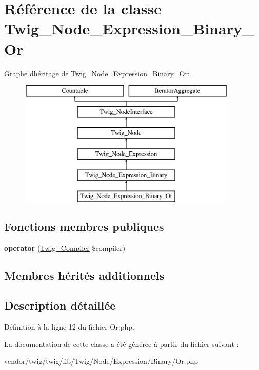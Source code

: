 \hypertarget{class_twig___node___expression___binary___or}{}\section{Référence de la classe Twig\+\_\+\+Node\+\_\+\+Expression\+\_\+\+Binary\+\_\+\+Or}
\label{class_twig___node___expression___binary___or}
Graphe d\textquotesingle{}héritage de Twig\+\_\+\+Node\+\_\+\+Expression\+\_\+\+Binary\+\_\+\+Or\+:\begin{figure}[H]
\begin{center}
\leavevmode
\includegraphics[height=6.000000cm]{class_twig___node___expression___binary___or}
\end{center}
\end{figure}
\subsection*{Fonctions membres publiques}
\begin{DoxyCompactItemize}
\item 
{\bfseries operator} (\hyperlink{class_twig___compiler}{Twig\+\_\+\+Compiler} \$compiler)\hypertarget{class_twig___node___expression___binary___or_af77318ec88d5f8a508684970a150b670}{}\label{class_twig___node___expression___binary___or_af77318ec88d5f8a508684970a150b670}

\end{DoxyCompactItemize}
\subsection*{Membres hérités additionnels}


\subsection{Description détaillée}


Définition à la ligne 12 du fichier Or.\+php.



La documentation de cette classe a été générée à partir du fichier suivant \+:\begin{DoxyCompactItemize}
\item 
vendor/twig/twig/lib/\+Twig/\+Node/\+Expression/\+Binary/Or.\+php\end{DoxyCompactItemize}
